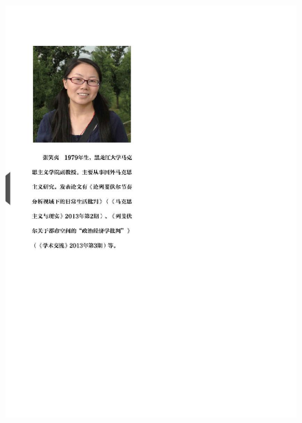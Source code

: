 \documentclass[UTF8, fontset = sourcesans, a4paper, oneside, zihao =
-4, scheme=chinese, no-math, space=true]{ctexbook}
\makeatletter
\def\maxwidth{\ifdim\Gin@nat@width>\linewidth\linewidth
\else\Gin@nat@width\fi}
\let\Oldincludegraphics\includegraphics
\renewcommand{\includegraphics}[1]{\Oldincludegraphics[width=\maxwidth]{#1}}
\makeatother
\begin{document}
\begin{figure}[!tbp]
  \centering
\includegraphics{images/00002.jpeg}
\end{figure}

\protect\hypertarget{part0002.html}{}{}
\end{document}
